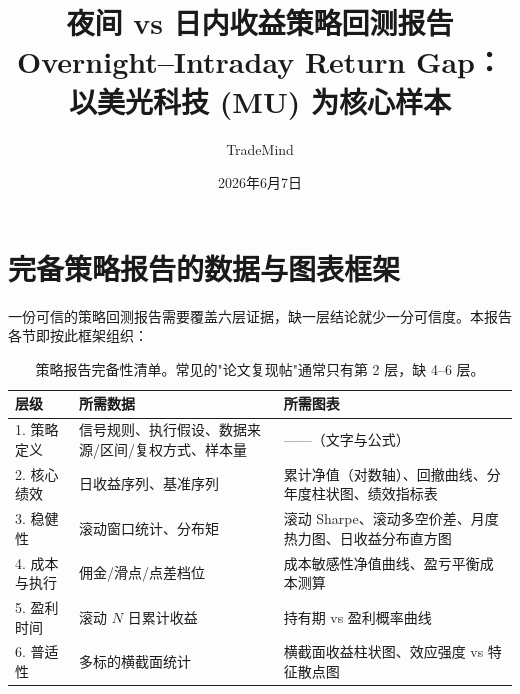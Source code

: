 \documentclass[11pt,a4paper,fontset=none]{ctexart}
\title{\bfseries 夜间 vs 日内收益策略回测报告\\
\large Overnight--Intraday Return Gap：以美光科技 (MU) 为核心样本}
\author{TradeMind}
\date{2026年6月7日}
\begin{document}
\maketitle

\begin{center}
\end{center}

\tableofcontents
\newpage

\section{完备策略报告的数据与图表框架}
一份可信的策略回测报告需要覆盖六层证据，缺一层结论就少一分可信度。本报告各节即按此框架组织：

\begin{table}[H]\centering\small
\begin{tabular}{p{2.6cm}p{5.6cm}p{6.2cm}}
\toprule
\textbf{层级} & \textbf{所需数据} & \textbf{所需图表} \\
\midrule
1. 策略定义 & 信号规则、执行假设、数据来源/区间/复权方式、样本量 & ——（文字与公式） \\
2. 核心绩效 & 日收益序列、基准序列 & 累计净值（对数轴）、回撤曲线、分年度柱状图、绩效指标表 \\
3. 稳健性 & 滚动窗口统计、分布矩 & 滚动 Sharpe、滚动多空价差、月度热力图、日收益分布直方图 \\
4. 成本与执行 & 佣金/滑点/点差档位 & 成本敏感性净值曲线、盈亏平衡成本测算 \\
5. 盈利时间 & 滚动 $N$ 日累计收益 & 持有期 vs 盈利概率曲线 \\
6. 普适性 & 多标的横截面统计 & 横截面收益柱状图、效应强度 vs 特征散点图 \\
\bottomrule
\end{tabular}
\caption{策略报告完备性清单。常见的"论文复现帖"通常只有第 2 层，缺 4--6 层。}
\end{table}
\end{document}
